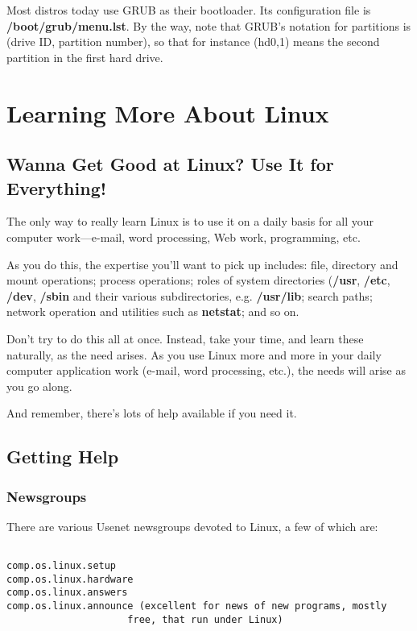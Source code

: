 \documentclass[11pt]{article}
\begin{document}
Most distros today use GRUB as their bootloader.  Its configuration
file is {\bf /boot/grub/menu.lst}.  By the way, note that GRUB's
notation for partitions is (drive ID, partition number), so that for
instance (hd0,1) means the second partition in the first hard drive.

\section{Learning More About Linux}

\subsection{Wanna Get Good at Linux?  Use It for Everything!}  
\label{useit}

The only way to really learn Linux is to use it on a daily basis for all
your computer work---e-mail, word processing, Web work, programming, etc.

As you do this, the expertise you'll want to pick up includes:  file,
directory and mount operations; process operations; roles of system
directories ({\bf /usr}, {\bf /etc}, {\bf /dev}, {\bf /sbin} and their
various subdirectories, e.g. {\bf /usr/lib}; search paths; network
operation and utilities such as {\bf netstat}; and so on.  

Don't try to do this all at once.  Instead, take your time, and learn
these naturally, as the need arises.  As you use Linux more and more in
your daily computer application work (e-mail, word processing, etc.),
the needs will arise as you go along.

And remember, there's lots of help available if you need it.

\subsection{Getting Help}
\label{help}

\subsubsection{Newsgroups}

There are various Usenet newsgroups devoted to Linux, a few of which
are:

\begin{verbatim}

comp.os.linux.setup
comp.os.linux.hardware
comp.os.linux.answers
comp.os.linux.announce (excellent for news of new programs, mostly
                     free, that run under Linux)
\end{verbatim}
\end{document}
